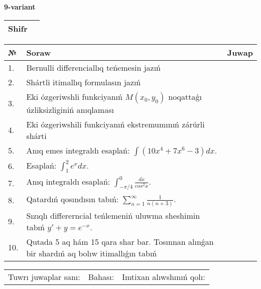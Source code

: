 \documentclass{article}
\begin{document}
  \egroup
  
  \newpage
  
  
  \textbf{9-variant}\\
  
  \bgroup
  \def\arraystretch{1.6} %
  
  \begin{tabular}{|m{5.7cm}|m{9.5cm}|}
  \hline
  Shifr & \\
  \hline
  \end{tabular}
  
  \vspace{1cm}
  
  \begin{tabular}{|m{0.7cm}|m{10cm}|m{4cm}|}
  \hline
  № & Soraw & Juwap \\
  \hline
  1. & Bernulli differenciallıq teńemesin jazıń &  \\
  \hline
  2. & Shártli itimallıq formulasın jazıń &  \\
  \hline
  3. & Eki ózgeriwshli funkciyanıń \(M(x_{0}, y_{0})\) noqattaǵı úzliksizliginiń anıqlaması &  \\
  \hline
  4. & Eki ózgeriwshili funkciyanıń ekstremumınıń zárúrli shárti &  \\
  \hline
  5. & Anıq emes integraldı esaplań: \(\int{\left( 10x^{4} + 7x^{6} - 3 \right)dx}\). &  \\
  \hline
  6. & Esaplań: \(\int_{1}^2 {e^{x}dx}\). &  \\
  \hline
  7. & Anıq integraldı esaplań: \(\int_{- \pi/4}^{0}\frac{dx}{cos^2 x}\). &  \\
  \hline
  8. & Qatardıń qosındısın tabıń: \(\sum_{n = 1}^{\infty}\frac{1}{n(n + 3)}\). &  \\
  \hline
  9. & Sızıqlı differerncial teńlemeniń uluwma sheshimin tabıń \(y' + y = e^{- x}\). &  \\
  \hline
  10. & Qutada 5 aq hám 15 qara shar bar. Tosınnan alınǵan bir shardıń aq bolıw itimallıǵın tabıń &  \\
  \hline
  \end{tabular}
  
  \vspace{1cm}
  
  \begin{tabular}{lll}
  Tuwrı juwaplar sanı: \underline{\hspace{1.5cm}} & 
  Bahası: \underline{\hspace{1.5cm}} & 
  Imtixan alıwshınıń qolı: \underline{\hspace{2cm}} \\
  \end{tabular}
  
\end{document}
